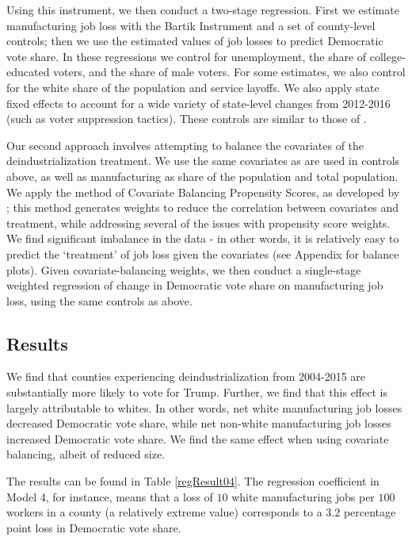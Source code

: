 \documentclass[]{AEA}
\begin{document}
Using this instrument, we then conduct a two-stage regression. First we
estimate manufacturing job loss with the Bartik Instrument and a set of
county-level controls; then we use the estimated values of job losses to
predict Democratic vote share. In these regressions we control for
unemployment, the share of college-educated voters, and the share of
male voters. For some estimates, we also control for the white share of
the population and service layoffs. We also apply state fixed effects to
account for a wide variety of state-level changes from 2012-2016 (such
as voter suppression tactics). These controls are similar to those of
\cite{Baccini21}.

Our second approach involves attempting to balance the covariates of the
deindustrialization treatment. We use the same covariates as are used in
controls above, as well as manufacturing as share of the population and
total population. We apply the method of Covariate Balancing Propensity
Scores, as developed by \cite{Imai14}; this method generates weights to
reduce the correlation between covariates and treatment, while
addressing several of the issues with propensity score weights. We find
significant imbalance in the data - in other words, it is relatively
easy to predict the `treatment' of job loss given the covariates (see
Appendix for balance plots). Given covariate-balancing weights, we then
conduct a single-stage weighted regression of change in Democratic vote
share on manufacturing job loss, using the same controls as above.

\subsection{Results}

We find that counties experiencing deindustrialization from 2004-2015
are substantially more likely to vote for Trump. Further, we find that
this effect is largely attributable to whites. In other words, net white
manufacturing job losses decreased Democratic vote share, while net
non-white manufacturing job losses increased Democratic vote share. We
find the same effect when using covariate balancing, albeit of reduced
size.

The results can be found in Table \ref{regResult04}. The regression
coefficient in Model 4, for instance, means that a loss of \(10\) white
manufacturing jobs per \(100\) workers in a county (a relatively extreme
value) corresponds to a \(3.2\) percentage point loss in Democratic vote
share. \FloatBarrier
\end{document}
